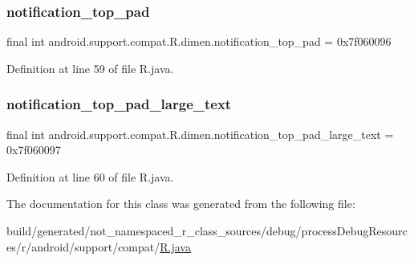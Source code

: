 \subsubsection{\texorpdfstring{notification\_top\_pad}{notification\_top\_pad}}
{\footnotesize\ttfamily final int android.\+support.\+compat.\+R.\+dimen.\+notification\+\_\+top\+\_\+pad = 0x7f060096\hspace{0.3cm}{\ttfamily [static]}}



Definition at line 59 of file R.\+java.

\mbox{\label{classandroid_1_1support_1_1compat_1_1_r_1_1dimen_ad749cef43f24176a5179b8856af52655}} 
\subsubsection{\texorpdfstring{notification\_top\_pad\_large\_text}{notification\_top\_pad\_large\_text}}
{\footnotesize\ttfamily final int android.\+support.\+compat.\+R.\+dimen.\+notification\+\_\+top\+\_\+pad\+\_\+large\+\_\+text = 0x7f060097\hspace{0.3cm}{\ttfamily [static]}}



Definition at line 60 of file R.\+java.



The documentation for this class was generated from the following file\+:\begin{DoxyCompactItemize}
\item 
build/generated/not\+\_\+namespaced\+\_\+r\+\_\+class\+\_\+sources/debug/process\+Debug\+Resources/r/android/support/compat/\mbox{\hyperlink{android_2support_2compat_2_r_8java}{R.\+java}}\end{DoxyCompactItemize}
